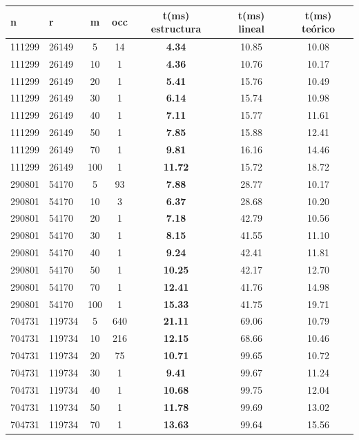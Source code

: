 \begin{table}[h!]
\centering
\begin{tabular}{|l|l|c|c|c|c|c|}
\hline
\textbf{n} & \textbf{r} & \textbf{m} & \textbf{occ} & \textbf{t(ms) estructura} & t(ms) lineal & t(ms) teórico \\ \hline
111299 & 26149 & 5 & 14 & \textbf{4.34} & 10.85 & 10.08 \\
111299 & 26149 & 10 & 1 & \textbf{4.36} & 10.76 & 10.17 \\
111299 & 26149 & 20 & 1 & \textbf{5.41} & 15.76 & 10.49 \\
111299 & 26149 & 30 & 1 & \textbf{6.14} & 15.74 & 10.98 \\
111299 & 26149 & 40 & 1 & \textbf{7.11} & 15.77 & 11.61 \\
111299 & 26149 & 50 & 1 & \textbf{7.85} & 15.88 & 12.41 \\
111299 & 26149 & 70 & 1 & \textbf{9.81} & 16.16 & 14.46 \\
111299 & 26149 & 100 & 1 & \textbf{11.72 }& 15.72 & 18.72 \\ \hline
290801 & 54170 & 5 & 93 & \textbf{7.88} & 28.77 & 10.17 \\
290801 & 54170 & 10 & 3 &\textbf{ 6.37 }& 28.68 & 10.20 \\
290801 & 54170 & 20 & 1 & \textbf{7.18} & 42.79 & 10.56 \\
290801 & 54170 & 30 & 1 & \textbf{8.15 }& 41.55 & 11.10 \\
290801 & 54170 & 40 & 1 & \textbf{9.24} & 42.41 & 11.81 \\
290801 & 54170 & 50 & 1 & \textbf{10.25} & 42.17 & 12.70 \\
290801 & 54170 & 70 & 1 & \textbf{12.41} & 41.76 & 14.98 \\
290801 & 54170 & 100 & 1 & \textbf{15.33} & 41.75 & 19.71 \\ \hline
704731 & 119734 & 5 & 640 & \textbf{21.11 }& 69.06 & 10.79 \\
704731 & 119734 & 10 & 216 & \textbf{12.15 }& 68.66 & 10.46 \\
704731 & 119734 & 20 & 75 & \textbf{10.71 }& 99.65 & 10.72 \\
704731 & 119734 & 30 & 1 & \textbf{ 9.41} & 99.67 & 11.24 \\
704731 & 119734 & 40 & 1 & \textbf{10.68} & 99.75 & 12.04 \\
704731 & 119734 & 50 & 1 & \textbf{11.78} & 99.69 & 13.02 \\
704731 & 119734 & 70 & 1 & \textbf{13.63} & 99.64 & 15.56 \\

\end{tabular}
\end{table}
